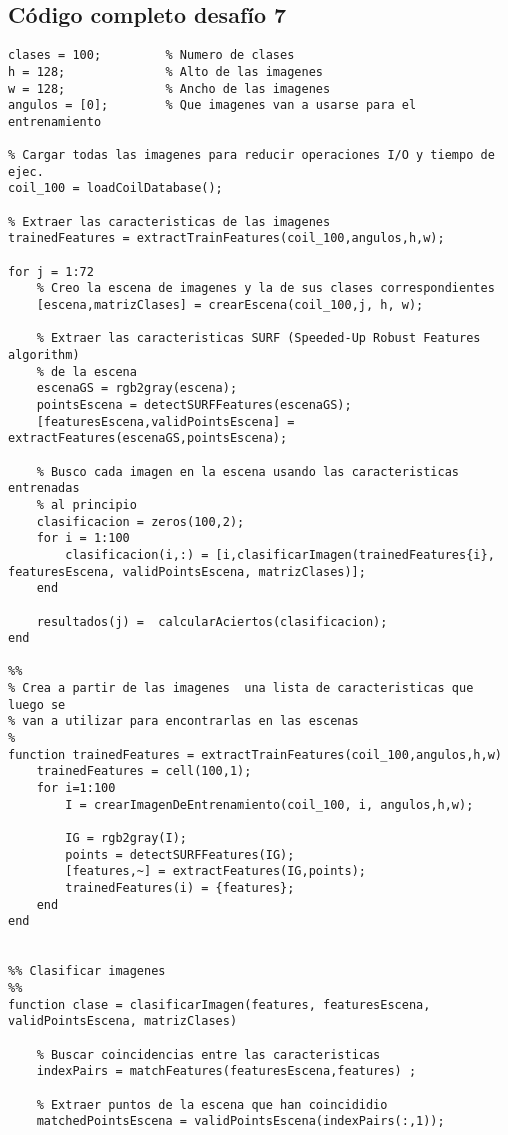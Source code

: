 \documentclass[es,gi]{ifirak}\usepackage[]{graphicx}\usepackage[]{color}
\begin{document}
\subsection{Código completo desafío 7}
\begin{lstlisting}
clases = 100;         % Numero de clases
h = 128;              % Alto de las imagenes
w = 128;              % Ancho de las imagenes
angulos = [0];        % Que imagenes van a usarse para el entrenamiento
 
% Cargar todas las imagenes para reducir operaciones I/O y tiempo de ejec.
coil_100 = loadCoilDatabase();
 
% Extraer las caracteristicas de las imagenes 
trainedFeatures = extractTrainFeatures(coil_100,angulos,h,w);

for j = 1:72
    % Creo la escena de imagenes y la de sus clases correspondientes
    [escena,matrizClases] = crearEscena(coil_100,j, h, w);

    % Extraer las caracteristicas SURF (Speeded-Up Robust Features algorithm)
    % de la escena
    escenaGS = rgb2gray(escena);
    pointsEscena = detectSURFFeatures(escenaGS);
    [featuresEscena,validPointsEscena] = extractFeatures(escenaGS,pointsEscena);

    % Busco cada imagen en la escena usando las caracteristicas entrenadas
    % al principio
    clasificacion = zeros(100,2);
    for i = 1:100
        clasificacion(i,:) = [i,clasificarImagen(trainedFeatures{i}, featuresEscena, validPointsEscena, matrizClases)];
    end
    
    resultados(j) =  calcularAciertos(clasificacion);
end

%% 
% Crea a partir de las imagenes  una lista de caracteristicas que luego se
% van a utilizar para encontrarlas en las escenas
%
function trainedFeatures = extractTrainFeatures(coil_100,angulos,h,w)
    trainedFeatures = cell(100,1);
    for i=1:100
        I = crearImagenDeEntrenamiento(coil_100, i, angulos,h,w);
       
        IG = rgb2gray(I);
        points = detectSURFFeatures(IG);
        [features,~] = extractFeatures(IG,points);
        trainedFeatures(i) = {features};
    end
end


%% Clasificar imagenes
%%
function clase = clasificarImagen(features, featuresEscena, validPointsEscena, matrizClases)
    
    % Buscar coincidencias entre las caracteristicas
    indexPairs = matchFeatures(featuresEscena,features) ;

    % Extraer puntos de la escena que han coincididio
    matchedPointsEscena = validPointsEscena(indexPairs(:,1));
    

\end{lstlisting}
\end{document}
